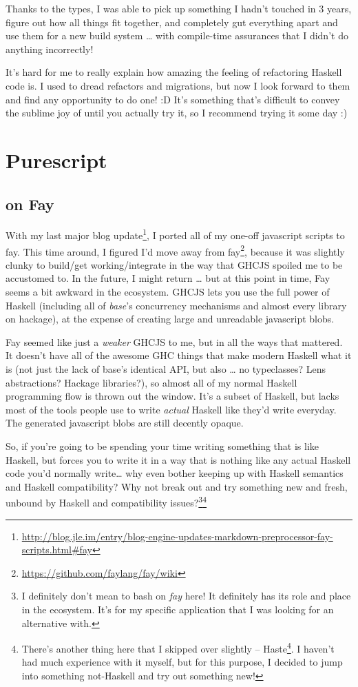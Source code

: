 \documentclass[]{article}
\renewcommand{\href}[2]{#2\footnote{\url{#1}}}
\begin{document}
Thanks to the types, I was able to pick up something I hadn't touched in
3 years, figure out how all things fit together, and completely gut
everything apart and use them for a new build system \ldots{} with
compile-time assurances that I didn't do anything incorrectly!

It's hard for me to really explain how amazing the feeling of
refactoring Haskell code is. I used to dread refactors and migrations,
but now I look forward to them and find any opportunity to do one! :D
It's something that's difficult to convey the sublime joy of until you
actually try it, so I recommend trying it some day :)

\section{Purescript}\label{purescript}

\subsection{on Fay}\label{on-fay}

With my
\href{http://blog.jle.im/entry/blog-engine-updates-markdown-preprocessor-fay-scripts.html\#fay}{last
major blog update}, I ported all of my one-off javascript scripts to
fay. This time around, I figured I'd move away from
\href{https://github.com/faylang/fay/wiki}{fay}, because it was slightly
clunky to build/get working/integrate in the way that GHCJS spoiled me
to be accustomed to. In the future, I might return \ldots{} but at this
point in time, Fay seems a bit awkward in the ecosystem. GHCJS lets you
use the full power of Haskell (including all of \emph{base}'s
concurrency mechanisms and almost every library on hackage), at the
expense of creating large and unreadable javascript blobs.

Fay seemed like just a \emph{weaker} GHCJS to me, but in all the ways
that mattered. It doesn't have all of the awesome GHC things that make
modern Haskell what it is (not just the lack of base's identical API,
but also \ldots{} no typeclasses? Lens abstractions? Hackage
libraries?), so almost all of my normal Haskell programming flow is
thrown out the window. It's a subset of Haskell, but lacks most of the
tools people use to write \emph{actual} Haskell like they'd write
everyday. The generated javascript blobs are still decently opaque.

So, if you're going to be spending your time writing something that is
like Haskell, but forces you to write it in a way that is nothing like
any actual Haskell code you'd normally write\ldots{} why even bother
keeping up with Haskell semantics and Haskell compatibility? Why not
break out and try something new and fresh, unbound by Haskell and
compatibility issues?\footnote{I definitely don't mean to bash on
  \emph{fay} here! It definitely has its role and place in the
  ecosystem. It's for my specific application that I was looking for an
  alternative with.}\footnote{There's another thing here that I skipped
  over slightly -- \href{http://haste-lang.org/}{Haste}. I haven't had
  much experience with it myself, but for this purpose, I decided to
  jump into something not-Haskell and try out something new!}
\end{document}
